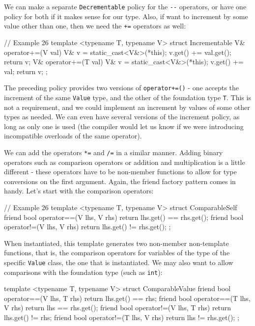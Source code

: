 We can make a separate \texttt{Decrementable} policy for the \texttt{-\/-} operators, or have one policy for both if it makes sense for our type. Also, if want to increment by some value other than one, then we need the \texttt{+=} operators as well:

\begin{code}
// Example 26
template <typename T, typename V> struct Incrementable {
  V& operator+=(V val) {
    V& v = static_cast<V&>(*this);
    v.get() += val.get();
    return v;
  }
  V& operator+=(T val) {
    V& v = static_cast<V&>(*this);
    v.get() += val;
    return v;
  }
};
\end{code}

The preceding policy provides two versions of \texttt{operator+=()} - one accepts the increment of the same \texttt{Value} type, and the other of the foundation type \texttt{T}. This is not a requirement, and we could implement an increment by values of some other types as needed. We can even have several versions of the increment policy, as long as only one is used (the compiler would let us know if we were introducing incompatible overloads of the same operator).

We can add the operators \texttt{*=} and \texttt{/=} in a similar manner. Adding binary operators such as comparison operators or addition and multiplication is a little different - these operators have to be non-member functions to allow for type conversions on the first argument. Again, the friend factory pattern comes in handy. Let's start with the comparison operators:

\begin{code}
// Example 26
template <typename T, typename V> struct ComparableSelf {
  friend bool operator==(V lhs, V rhs) {
    return lhs.get() == rhs.get();
  }
  friend bool operator!=(V lhs, V rhs) {
    return lhs.get() != rhs.get();
  }
};
\end{code}

When instantiated, this template generates two non-member non-template functions, that is, the comparison operators for variables of the type of the specific \texttt{Value} class, the one that is instantiated. We may also want to allow comparisons with the foundation type (such as \texttt{int}):

\begin{code}
template <typename T, typename V> struct ComparableValue {
  friend bool operator==(V lhs, T rhs) {
    return lhs.get() == rhs;
  }
  friend bool operator==(T lhs, V rhs) {
    return lhs == rhs.get();
  }
  friend bool operator!=(V lhs, T rhs) {
    return lhs.get() != rhs;
  }
  friend bool operator!=(T lhs, V rhs) {
    return lhs != rhs.get();
  }
};
\end{code}

